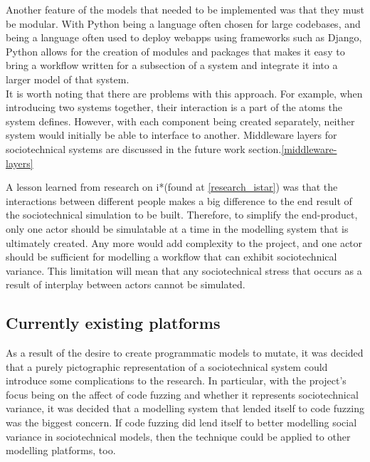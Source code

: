 Another feature of the models that needed to be implemented was that they must be modular. With Python being a language often chosen for large codebases, and being a language often used to deploy webapps using frameworks such as Django\cite{Azzopardi2016a}, Python allows for the creation of modules and packages that makes it easy to bring a workflow written for a subsection of a system and integrate it into a larger model of that system. \\
It is worth noting that there are problems with this approach. For example, when introducing two systems together, their interaction is a part of the atoms the system defines. However, with each component being created separately, neither system would initially be able to interface to another. Middleware layers for sociotechnical systems are discussed in the future work section.\cref{middleware-layers} \par%

A lesson learned from research on i*(found at \cref{research_istar}) was that the interactions between different people makes a big difference to the end result of the sociotechnical simulation to be built. Therefore, to simplify the end-product, only one actor should be simulatable at a time in the modelling system that is ultimately created. Any more would add complexity to the project, and one actor should be sufficient for modelling a workflow that can exhibit sociotechnical variance. This limitation will mean that any sociotechnical stress that occurs as a result of interplay between actors cannot be simulated. \par

\subsection{Currently existing platforms}
As a result of the desire to create programmatic models to mutate, it was decided that a purely pictographic representation of a sociotechnical system could introduce some complications to the research. In particular, with the project's focus being on the affect of code fuzzing and whether it represents sociotechnical variance, it was decided that a modelling system that lended itself to code fuzzing was the biggest concern. If code fuzzing did lend itself to better modelling social variance in sociotechnical models, then the technique could be applied to other modelling platforms, too. \par

